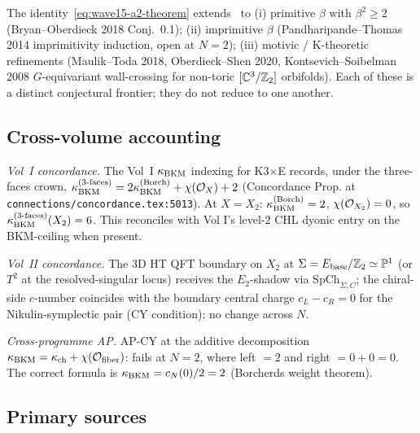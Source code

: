 \begin{corollary}
\label{cor:wave15-a2-residual-scope}
The identity~\eqref{eq:wave15-a2-theorem} extends
\ClaimStatusConjectured\ to (i) primitive $\beta$ with $\beta^2 \geq 2$
(Bryan--Oberdieck 2018 Conj.~0.1); (ii) imprimitive $\beta$
(Pandharipande--Thomas 2014 imprimitivity induction, open at $N = 2$);
(iii) motivic / K-theoretic refinements (Maulik--Toda 2018,
Oberdieck--Shen 2020, Kontsevich--Soibelman 2008 $G$-equivariant
wall-crossing for non-toric $[\mathbb{C}^3/\mathbb{Z}_2]$ orbifolds). Each of these
is a distinct conjectural frontier; they do not reduce to one another.
\end{corollary}

\subsection{Cross-volume accounting}
\label{subsec:a2-xvol}

\emph{Vol~I concordance.} The Vol~I $\kappa_{\mathrm{BKM}}$ indexing for K3$\times$E
records, under the three-faces crown,
$\kappa_{\mathrm{BKM}}^{(3\text{-faces})} = 2\kappa_{\mathrm{BKM}}^{(\mathrm{Borch})} + \chi(\mathcal{O}_X) + 2$
(Concordance Prop. at \texttt{connections/concordance.tex:5013}).
At $X = X_2$: $\kappa_{\mathrm{BKM}}^{(\mathrm{Borch})} = 2$, $\chi(\mathcal{O}_{X_2}) = 0$,
so $\kappa_{\mathrm{BKM}}^{(3\text{-faces})}(X_2) = 6$. This reconciles with Vol I's
level-$2$ CHL dyonic entry on the BKM-ceiling when present.

\emph{Vol~II concordance.} The 3D HT QFT boundary on $X_2$ at
$\Sigma = E_{\mathrm{base}}/\mathbb{Z}_2 \simeq \mathbb{P}^1$ (or $T^2$ at the
resolved-singular locus) receives the $E_2$-shadow via
$\mathrm{SpCh}_{\Sigma, C}$; the chiral-side $c$-number coincides with
the boundary central charge $c_L - c_R = 0$ for the Nikulin-symplectic
pair (CY condition); no change across $N$.

\emph{Cross-programme AP.} AP-CY at the additive decomposition
$\kappa_{\mathrm{BKM}} = \kappa_{\mathrm{ch}} + \chi(\mathcal{O}_{\mathrm{fiber}})$: fails at $N = 2$,
where left $= 2$ and right $= 0 + 0 = 0$. The correct formula is
$\kappa_{\mathrm{BKM}} = c_N(0)/2 = 2$ (Borcherds weight theorem).

\subsection*{Primary sources}
\label{subsec:a2-primary-sources}


